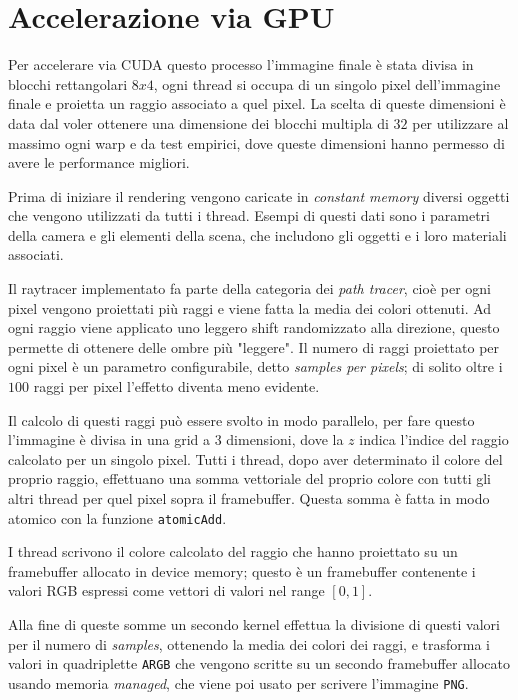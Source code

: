 \documentclass[12pt, twoside]{article}
\begin{document}
\section{Accelerazione via GPU}
Per accelerare via CUDA questo processo l'immagine finale è stata divisa in
blocchi rettangolari $8 x 4$, ogni thread si occupa di un singolo pixel
dell'immagine finale e proietta un raggio associato a quel pixel.
La scelta di queste dimensioni è data dal voler ottenere una dimensione dei
blocchi multipla di $32$ per utilizzare al massimo ogni warp e da test
empirici, dove queste dimensioni hanno permesso di avere le performance
migliori.

Prima di iniziare il rendering vengono caricate in \textit{constant memory}
diversi oggetti che vengono utilizzati da tutti i thread.
Esempi di questi dati sono i parametri della camera e gli elementi della
scena, che includono gli oggetti e i loro materiali associati.

Il raytracer implementato fa parte della categoria dei \textit{path tracer},
cioè per ogni pixel vengono proiettati più raggi e viene fatta la media dei
colori ottenuti.
Ad ogni raggio viene applicato uno leggero shift randomizzato alla direzione,
questo permette di ottenere delle ombre più "leggere".
Il numero di raggi proiettato per ogni pixel è un parametro configurabile,
detto \textit{samples per pixels}; di solito oltre i $100$ raggi per pixel
l'effetto diventa meno evidente.

Il calcolo di questi raggi può essere svolto in modo parallelo, per fare
questo l'immagine è divisa in una grid a 3 dimensioni, dove la $z$ indica
l'indice del raggio calcolato per un singolo pixel.
Tutti i thread, dopo aver determinato il colore del proprio raggio, effettuano
una somma vettoriale del proprio colore con tutti gli altri thread per quel
pixel sopra il framebuffer.
Questa somma è fatta in modo atomico con la funzione \texttt{atomicAdd}.

I thread scrivono il colore calcolato del raggio che hanno proiettato su un
framebuffer allocato in device memory; questo è un framebuffer contenente i
valori RGB espressi come vettori di valori nel range $[0, 1]$.

Alla fine di queste somme un secondo kernel effettua la divisione di questi
valori per il numero di \textit{samples}, ottenendo la media dei colori dei
raggi, e trasforma i valori in quadriplette \texttt{ARGB} che vengono scritte
su un secondo framebuffer allocato usando memoria \textit{managed}, che viene
poi usato per scrivere l'immagine \texttt{PNG}.
\end{document}
